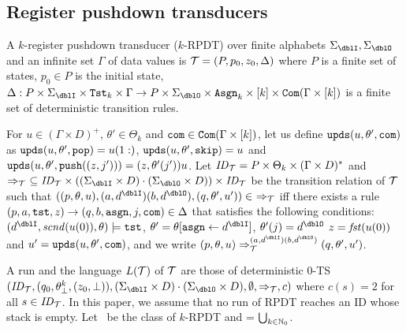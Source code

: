 \subsection{Register pushdown transducers}
\begin{definition}
A $k$-{register pushdown transducer} ($k$-RPDT) over finite alphabets $\Sigma_\dblI,\Sigma_\dblO$ and an infinite set $\Gamma$ of data values is
${\cal T}=(P, p_0, z_0, \Delta)$ where
$P$ is a finite set of states,
$p_0\in P$ is the initial state,
$\Delta: P\times\Sigma_\dblI\times\Tst_k\times\Gamma \to P\times\Sigma_\dblO\times \Asgn_k \times [k]\times \Com(\Gamma\times[k])$ is a finite set of deterministic transition rules.
\end{definition}
For $u\in (\Gamma\times D)^+$, $\theta'\in\Theta_k$ and $\mathtt{com}\in\mathtt{Com}(\Gamma\times[k])$, let us define $\mathtt{upds}(u,\theta',\mathtt{com})$ as $\mathtt{upds}(u,\theta',\mathtt{pop})=u(1:)$, $\mathtt{upds}(u,\theta',\mathtt{skip})=u$ and $\mathtt{upds}(u,\theta',\mathtt{push}((z,j')))=(z,\theta'(j'))u$.
Let $\mathit{ID}_{\cal T}= P\times \Theta_k\times (\Gamma\times D)^*$
and $\Rightarrow_\calT\ \subseteq \ID_\calT\times ((\Sigma_\dblI\times D)\cdot(\Sigma_\dblO\times D))\times \ID_\calT$ be the transition relation of ${\cal T}$ such that $((p, \theta, u), (a,d^\dblI)(b,d^\dblO), (q, \theta', u'))\in\ \Rightarrow_\calT$ iff
there exists a rule $(p, a, \mathtt{tst}, z) \to (q, b, \mathtt{asgn}, j, \mathtt{com}) \in \Delta$
that satisfies the following conditions:
$(d^\dblI, \scnd(u(0)), \theta)\models\tst$, $\theta' = \theta[\asgn\leftarrow d^\dblI]$, $\theta'(j) = d^\dblO$
$z=\mathit{fst}(u(0))$ and
$u'=\mathtt{upds}(u,\theta',\mathtt{com})$,
and we write $(p, \theta, u) \done_{\calT}^{(a,d^\dblI)(b,d^\dblO)}(q, \theta', u')$.

A run and the language $L({\cal T})$ of ${\cal T}$ are those of deterministic $0$-TS $(\ID_\calT, (q_0,\theta^k_\bot, (z_0,\bot)), (\Sigma_\dblI\times D)\cdot(\Sigma_\dblO\times D), \emptyset, \Rightarrow_\calT, c)$ where $c(s)=2$ for all $s\in\mathit{ID}_{\cal T}$.
In this paper,
we assume that no run of RPDT reaches an ID whose stack is empty.
Let \RPDTk\ be the class of $k$-RPDT and \RPDT = $\bigcup_{k\in\mathbb{N}_0}$\RPDTk.

